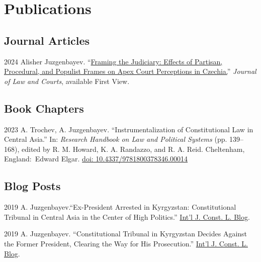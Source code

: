 \documentclass[11pt,letterpaper]{report}
\begin{document}
    \section*{Publications}

   \subsection*{Journal Articles}

   \begin{tablist}

       

        \item[2024] \tab{}Alisher Juzgenbayev. \enquote{\href{https://doi.org/10.1017/jlc.2024.17}{Framing the Judiciary: Effects of Partisan, Procedural, and Populist Frames on Apex Court Perceptions in Czechia.}} \textit{Journal of Law and Courts}, available First View.

      

    \end{tablist}



    \subsection*{Book Chapters}

    \begin{tablist}

        \item[2023] \tab{}A. Trochev, A. Juzgenbayev. \enquote{Instrumentalization of Constitutional Law in Central Asia.} In: \textit{Research Handbook on Law and Political Systems} (pp. 139--168), edited by R. M. Howard, K. A. Randazzo, and  R. A. Reid. Cheltenham, England:\ Edward Elgar. \href{https://doi.org/10.4337/9781800378346.00014}{doi: 10.4337/9781800378346.00014}

    \end{tablist}

    \subsection*{Blog Posts}

    \begin{tablist}
        
        \item[2019] \tab{}A. Juzgenbayev.\enquote{Ex-President Arrested in Kyrgyzstan: Constitutional Tribunal in Central Asia in the Center of High Politics.} \href{http://www.iconnectblog.com/2019/08/ex-president-arrested-in-kyrgyzstan-constitutional-tribunal-in-central-asia-in-the-center-of-high-politics/}{Int’l J. Const. L. Blog}. 
        \item[2019] \tab{}A. Juzgenbayev. \enquote{Constitutional Tribunal in Kyrgyzstan Decides Against the Former President, Clearing the Way for His Prosecution.} \href{http://www.iconnectblog.com/2019/11/constitutional-tribunal-in-kyrgyzstan-decides-against-the-former-president-clearing-the-way-for-his-prosecution/}{Int’l J. Const. L. Blog}.
    \end{tablist}
\end{document}
